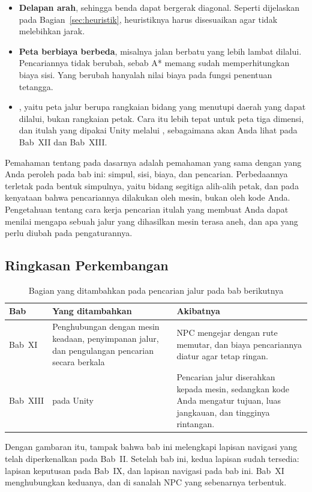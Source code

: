 \begin{itemize}
  \item \textbf{Delapan arah}, sehingga benda dapat bergerak diagonal. Seperti
        dijelaskan pada Bagian~\ref{sec:heuristik}, heuristiknya harus
        disesuaikan agar tidak melebihkan jarak.
  \item \textbf{Peta berbiaya berbeda}, misalnya jalan berbatu yang lebih
        lambat dilalui. Pencariannya tidak berubah, sebab A* memang sudah
        memperhitungkan biaya sisi. Yang berubah hanyalah nilai biaya pada
        fungsi penentuan tetangga.
  \item \textbf{}, yaitu peta jalur berupa rangkaian bidang
        yang menutupi daerah yang dapat dilalui, bukan rangkaian petak. Cara itu
        lebih tepat untuk peta tiga dimensi, dan itulah yang dipakai Unity
        melalui , sebagaimana akan Anda lihat pada
        Bab~XII dan Bab~XIII.
\end{itemize}

\begin{catatabox}
Pemahaman tentang  pada dasarnya adalah
pemahaman yang sama dengan yang Anda peroleh pada bab ini: simpul, sisi, biaya,
dan pencarian. Perbedaannya terletak pada bentuk simpulnya, yaitu bidang
segitiga alih-alih petak, dan pada kenyataan bahwa pencariannya dilakukan oleh
mesin, bukan oleh kode Anda. Pengetahuan tentang cara kerja pencarian itulah
yang membuat Anda dapat menilai mengapa sebuah jalur yang dihasilkan mesin
terasa aneh, dan apa yang perlu diubah pada pengaturannya.
\end{catatabox}

\subsection{Ringkasan Perkembangan}

\begin{table}[htbp]
\centering
\caption{Bagian yang ditambahkan pada pencarian jalur pada bab berikutnya}
\label{tab:perkembangan-astar}
{\setlength{\tabcolsep}{4pt}\footnotesize%
\begin{tabularx}{\textwidth}{@{}C{1.6cm} L{5.0cm} Y@{}}
\toprule
\headrow \textbf{Bab} & \textbf{Yang ditambahkan} & \textbf{Akibatnya} \\
\midrule
Bab~XI & Penghubungan dengan mesin keadaan, penyimpanan jalur, dan pengulangan
pencarian secara berkala &
NPC mengejar dengan rute memutar, dan biaya pencariannya diatur agar tetap
ringan. \\
\addlinespace
Bab~XIII &  pada Unity &
Pencarian jalur diserahkan kepada mesin, sedangkan kode Anda mengatur tujuan,
luas jangkauan, dan tingginya rintangan. \\
\bottomrule
\end{tabularx}}
\end{table}

Dengan gambaran itu, tampak bahwa bab ini melengkapi lapisan navigasi yang
telah diperkenalkan pada Bab~II. Setelah bab ini, kedua lapisan sudah tersedia:
lapisan keputusan pada Bab~IX, dan lapisan navigasi pada bab ini. Bab~XI
menghubungkan keduanya, dan di sanalah NPC yang sebenarnya terbentuk.
